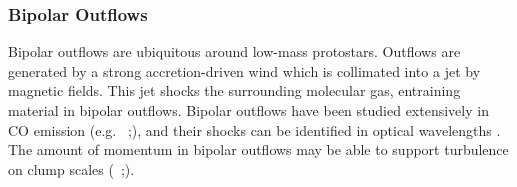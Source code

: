 \subsubsection{Bipolar Outflows}\label{sec:outflow}
Bipolar outflows are ubiquitous around low-mass protostars. Outflows are generated by a strong accretion-driven wind which is collimated into a jet by magnetic fields. This jet shocks the surrounding molecular gas, entraining material in bipolar outflows. Bipolar outflows have been studied extensively in CO emission (e.g. \citet{Plunkett_2013}~;\cite{Plunkett_2015}), and their shocks can be identified in optical wavelengths \cite{Reipurth_2001}. The amount of momentum in bipolar outflows may be able to support turbulence on clump scales (\citet{Frank14}~;\citet{Offner_2014}).
